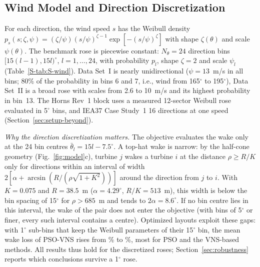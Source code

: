 \subsection{Wind Model and Direction Discretization}
\label{sec:wind}
For each direction, the wind speed $s$ has the Weibull density $p_s(s;\zeta,\psi)=(\zeta/\psi)\allowbreak(s/\psi)^{\zeta-1}\allowbreak\exp[-(s/\psi)^{\zeta}]$ with shape $\zeta(\theta)$ and scale $\psi(\theta)$. The benchmark rose is piecewise constant: $N_\theta=24$ direction bins $[15(l-1),15l)^\circ$, $l=1,\ldots,24$, with probability $p_l$, shape $\zeta=2$ and scale $\psi_l$ (Table~\ref{S-tab:S-wind}). Data Set~I is nearly unidirectional ($\psi=13$~m/s in all bins; 80\% of the probability in bins 6 and 7, i.e., wind from 165$^\circ$ to 195$^\circ$), Data Set~II is a broad rose with scales from 2.6 to 10~m/s and its highest probability in bin~13. The Horns Rev~1 block uses a measured 12-sector Weibull rose evaluated in 5$^\circ$ bins, and IEA37 Case Study~1 16 directions at one speed (Section~\ref{sec:setup-beyond}).

\emph{Why the direction discretization matters.} The objective evaluates the wake only at the 24 bin centres $\bar\theta_l=15l-7.5^\circ$. A top-hat wake is narrow: by the half-cone geometry (Fig.~\ref{fig:model}c), turbine $j$ wakes a turbine $i$ at the distance $\rho\ge R/K$ only for directions within an interval of width $2[\alpha+\arcsin(R/(\rho\sqrt{1+K^2}))]$ around the direction from $j$ to $i$. With $K=0.075$ and $R=38.5$~m ($\alpha=4.29^\circ$, $R/K=513$~m), this width is below the bin spacing of 15$^\circ$ for $\rho>685$~m and tends to $2\alpha=8.6^\circ$. If no bin centre lies in this interval, the wake of the pair does not enter the objective (with bins of 5$^\circ$ or finer, every such interval contains a centre). Optimized layouts exploit these gaps: with 1$^\circ$ sub-bins that keep the Weibull parameters of their 15$^\circ$ bin, the mean wake loss of PSO-VNS rises from \NFLossPSOVNSFifteen\% to \NFLossPSOVNSOne\%, most for PSO and the VNS-based methods. All results thus hold for the discretized roses; Section~\ref{sec:robustness} reports which conclusions survive a 1$^\circ$ rose.

